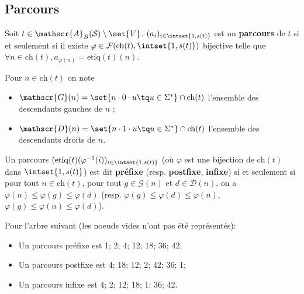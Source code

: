 \documentclass{scrartcl}
\begin{document}
		\subsection{Parcours}
			Soit $t \in \mathscr{A}_B(\mathcal{S})\setminus\set{V}$.
			$(a_i)_{i\in\intset{1,s(t)}}$ est un \textbf{parcours} de $t$ si et seulement si il existe $\varphi \in \mathcal{F}(\mathrm{ch}(t), \intset{1,s(t)})$ bijective telle que $\forall n \in \mathrm{ch}(t), a_{\varphi(n)} = \text{etiq}(t)(n)$.

			Pour $n \in \mathrm{ch}(t)$ on note 
			\begin{itemize}
				\item $\mathscr{G}(n) = \set{n\cdot 0 \cdot u \tq u \in \Sigma^*} \cap \mathrm{ch}(t)$ l'ensemble des descendants gauches de $n$ ;
				\item $\mathscr{D}(n) = \set{n\cdot 1 \cdot u \tq u \in \Sigma^*} \cap \mathrm{ch}(t)$ l'ensemble des descendants droits de $n$.
			\end{itemize}

			
			Un parcours $(\mathrm{etiq}(t)(\varphi^{-1}(i))_{i \in \intset{1,s(t)}}$ (où $\varphi$ est une bijection de $\mathrm{ch}(t)$ dans $\intset{1, s(t)}$)
			est dit \textbf{préfixe} (resp. \textbf{postfixe}, \textbf{infixe}) si et seulement si pour tout $n \in \mathrm{ch}(t)$, pour tout $g \in \mathscr{G}(n)$ et $d \in \mathscr{D}(n)$,
			on a $\varphi(n) \leq \varphi(g) \leq \varphi(d)$ (resp. $\varphi(g) \leq \varphi(d) \leq \varphi(n)$, $\varphi(g) \leq \varphi(n) \leq \varphi(d)$).

			\exemple Pour l'arbre suivant (les noeuds vides n'ont pas été représentés): 
			\begin{center}
			\end{center}
			\begin{itemize}
				\item Un parcours préfixe est 1; 2; 4; 12; 18; 36; 42;
				\item Un parcours postfixe est 4; 18; 12; 2; 42; 36; 1;
				\item Un parcours infixe est 4; 2; 12; 18; 1; 36; 42.
			\end{itemize}
\end{document}
